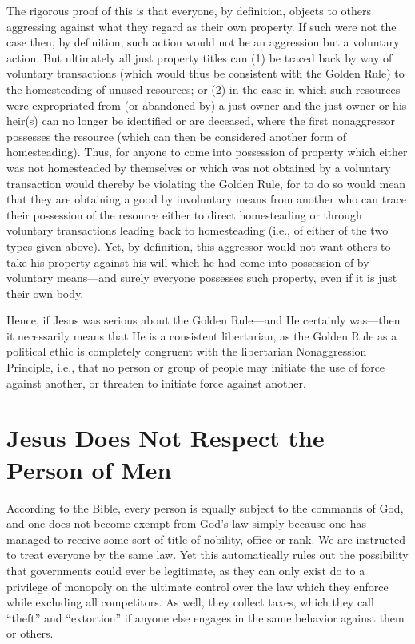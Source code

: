 \documentclass[letterpaper,12pt]{article}
\begin{document}
The rigorous proof of this is that everyone, by definition, objects to others aggressing against what they regard as their own property. If such were not the case then, by definition, such action would not be an aggression but a voluntary action. But ultimately all just property titles can (1) be traced back by way of voluntary transactions (which would thus be consistent with the Golden Rule) to the homesteading of unused resources; or (2) in the case in which such resources were expropriated from (or abandoned by) a just owner and the just owner or his heir(s) can no longer be identified or are deceased, where the first nonaggressor possesses the resource (which can then be considered another form of homesteading). Thus, for anyone to come into possession of property which either was not homesteaded by themselves or which was not obtained by a voluntary transaction would thereby be violating the Golden Rule, for to do so would mean that they are obtaining a good by involuntary means from another who can trace their possession of the resource either to direct homesteading or through voluntary transactions leading back to homesteading (i.e., of either of the two types given above). Yet, by definition, this aggressor would not want others to take his property against his will which he had come into possession of by voluntary means---and surely everyone possesses such property, even if it is just their own body.

Hence, if Jesus was serious about the Golden Rule---and He certainly was---then it necessarily means that He is a consistent libertarian, as the Golden Rule as a political ethic is completely congruent with the libertarian Nonaggression Principle, i.e., that no person or group of people may initiate the use of force against another, or threaten to initiate force against another.

\section{Jesus Does Not Respect the Person of Men}
\label{sec:JesusDoesNotRespectThePersonOfMen}

According to the Bible, every person is equally subject to the commands of God, and one does not become exempt from God's law simply because one has managed to receive some sort of title of nobility, office or rank. We are instructed to treat everyone by the same law. Yet this automatically rules out the possibility that governments could ever be legitimate, as they can only exist do to a privilege of monopoly on the ultimate control over the law which they enforce while excluding all competitors. As well, they collect taxes, which they call ``theft'' and ``extortion'' if anyone else engages in the same behavior against them or others. 
\end{document}
